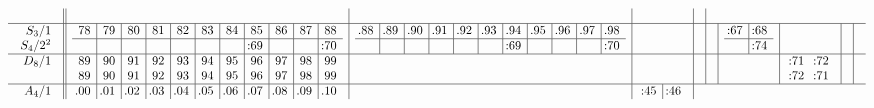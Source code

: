 \documentclass[12pt,a4paper]{amsart}
\begin{document}
\begin{align*}
\begin{array}{r||c|c|c|c|c|c|c|c|c}
\begin{array}{r|rrr|rrrrrr}
\end{array}
&&&&\\
\hline
    \begin{array}{r}
      S_3/1 \\ S_4/2^2 \\
    \end{array}
&
  \begin{array}{r|r|r|r|r|r|r|r|r|r|r}%
78&79&80&81&82&83&84&85&86&87&88\\%
\hline
&&&&&&&\llap:69&&&\llap:70\\%
\end{array}
&
\begin{array}{r|r|r|r|r|r|r|r|r|r|r}%
\llap.88&\llap.89&\llap.90&\llap.91&\llap.92&\llap.93&\llap.94&\llap.95&\llap.96&\llap.97&\llap.98\\%
\hline
&&&&&&\llap:69&&&&\llap:70\\%
\end{array}
&&&&
\begin{array}{r|r}%
\llap:67&\llap:68\\%
\hline
&\llap:74\\%
\end{array}
&&&\\
\hline
    \begin{array}{r}
      D_8/1 \\ \\
    \end{array}
&
  \begin{array}{r|r|r|r|r|r|r|r|r|r|r}%
89&90&91&92&93&94&95&96&97&98&99\\%
89&90&91&92&93&94&95&96&97&98&99\\%
\end{array}
&&&&&&
\begin{array}{rr}%
\llap:71&\llap:72\\%
\llap:72&\llap:71\\%
\end{array}
&&\\
\hline
    \begin{array}{r}
      A_4/1 \\
    \end{array}
&
  \begin{array}{r|r|r|r|r|r|r|r|r|r|r}%
\llap.00&\llap.01&\llap.02&\llap.03&\llap.04&\llap.05&\llap.06&\llap.07&\llap.08&\llap.09&\llap.10\\%
\end{array}
&&
\begin{array}{r|r}%
\llap:45&\llap:46\\%

\end{array}
\end{array}
\end{align*}
\end{document}
